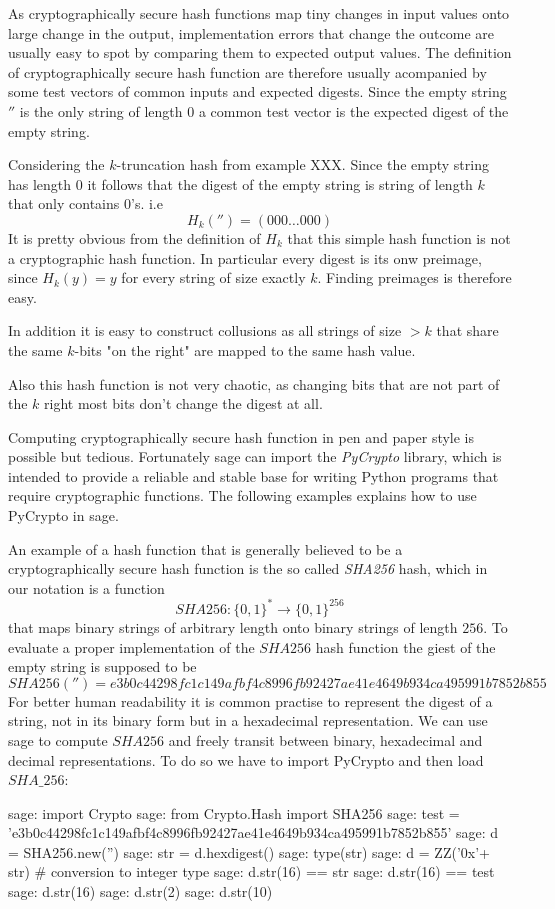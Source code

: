 As cryptographically secure hash functions map tiny changes in input values onto large change in the output, implementation errors that change the outcome are usually easy to spot by comparing them to expected output values. The definition of cryptographically secure hash function are therefore usually acompanied by some test vectors of common inputs and expected digests. Since the empty string $''$ is the only string of length $0$ a common test vector is the expected digest of the empty string.
\begin{example} Considering the $k$-truncation hash from example XXX. Since the empty string has length $0$ it follows that the digest of the empty string is string of length $k$ that only contains $0$'s. i.e 
$$
H_k('')= (000\ldots 000)
$$
It is pretty obvious from the definition of $H_k$ that this simple hash function is not a cryptographic hash function. In particular every digest is its onw preimage, since $H_k(y)=y$ for every string of size exactly $k$. Finding preimages is therefore easy. 

In addition it is easy to construct collusions as all strings of size $>k$ that share the same $k$-bits "on the right" are mapped to the same hash value.

Also this hash function is not very chaotic, as changing bits that are not part of the $k$ right most bits don't change the digest at all.  
\end{example}
Computing cryptographically secure hash function in pen and paper style is possible but tedious. Fortunately sage can import the \textit{PyCrypto} library, which is intended to provide a reliable and stable base for writing Python programs that require cryptographic functions. The following examples explains how to use PyCrypto in sage.
\begin{example}An example of a hash function that is generally believed to be a cryptographically secure hash function is the so called \textit{SHA256} hash, which in our notation is a function
$$
SHA256: \{0,1\}^* \to \{0,1\}^{256}
$$
that maps binary strings of arbitrary length onto binary strings of length $256$. To evaluate a proper implementation of the $SHA256$ hash function the giest of the empty string is supposed to be
$$
SHA256('')= e3b0c44298fc1c149afbf4c8996fb92427ae41e4649b934ca495991b7852b855
$$
For better human readability it is common practise to represent the digest of a string, not in its binary form but in a hexadecimal representation. We can use sage to compute $SHA256$ and freely transit between binary, hexadecimal and decimal representations. To do so we have to import PyCrypto and then load $SHA\_256$:
\begin{sagecommandline}
sage: import Crypto
sage: from Crypto.Hash import SHA256
sage: test = 'e3b0c44298fc1c149afbf4c8996fb92427ae41e4649b934ca495991b7852b855'
sage: d = SHA256.new('')
sage: str = d.hexdigest()
sage: type(str)
sage: d = ZZ('0x'+ str) # conversion to integer type
sage: d.str(16) == str
sage: d.str(16) == test
sage: d.str(16)
sage: d.str(2)
sage: d.str(10)
\end{sagecommandline}
\end{example}

